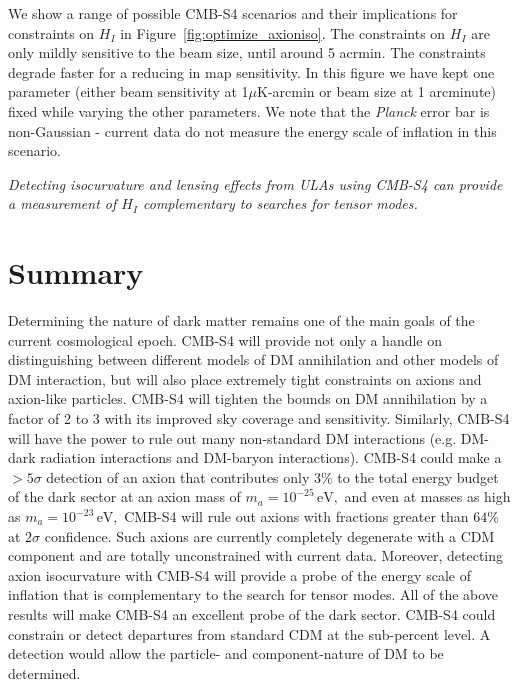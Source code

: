 We show a range of possible CMB-S4 scenarios and their implications for constraints on $H_I$ in Figure~\ref{fig:optimize_axioniso}. The constraints on $H_I$ are only mildly sensitive to the beam size, until around 5 acrmin. The constraints degrade faster for a reducing in map sensitivity. In this figure we have kept one parameter (either beam sensitivity at 1$\mu$K-arcmin or beam size at 1 arcminute) fixed while varying the other parameters. We note that the \textit{Planck} error bar is non-Gaussian - current data do not measure the energy scale of inflation in this scenario.

\emph{Detecting isocurvature and lensing effects from ULAs using CMB-S4 can provide a measurement of $H_I$ complementary to searches for tensor modes.}%

 
\section{Summary}
Determining the nature of dark matter remains one of the main goals of the current cosmological epoch. CMB-S4 will provide not only a handle on distinguishing between different models of DM annihilation and other models of DM interaction, but will also place extremely tight constraints on axions and axion-like particles. CMB-S4 will tighten the bounds on DM annihilation by a factor of 2 to 3 with its improved sky coverage and sensitivity. Similarly, CMB-S4 will have the power to rule out many non-standard DM interactions (e.g. DM-dark radiation interactions and DM-baryon interactions). 
CMB-S4 could make a $>5\sigma$ detection of an axion that contributes only $3\%$ to the total energy budget of the dark sector at an axion mass of $m_a=10^{-25}\,\mathrm{eV},$ and even at masses as high as $m_a=10^{-23}\,\mathrm{eV},$ CMB-S4 will rule out axions with fractions greater than $64\%$ at $2\sigma$ confidence. Such axions are currently completely degenerate with a CDM component and are totally unconstrained with current data.  Moreover, detecting axion isocurvature with CMB-S4 will provide a probe of the energy scale of inflation that is complementary to the search for tensor modes. 
All of the above results will make CMB-S4 an excellent probe of the dark sector. CMB-S4 could constrain or detect departures from standard CDM at the sub-percent level. A detection would allow the particle- and component-nature of DM to be determined.

